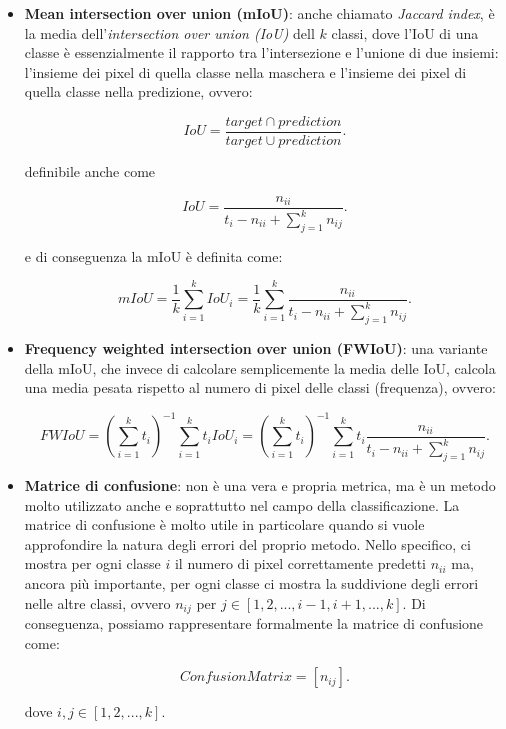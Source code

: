 \begin{itemize}
    
    \item \textbf{Mean intersection over union (mIoU)}: anche chiamato \textit{Jaccard index}, è la media dell'\textit{intersection over union (IoU)} dell $k$ classi, dove l'IoU di una classe è essenzialmente il rapporto tra l'intersezione e l'unione di due insiemi: l'insieme dei pixel di quella classe nella maschera e l'insieme dei pixel di quella classe nella predizione, ovvero:
    
    \begin{equation}
        IoU = \frac{target \cap prediction}{target \cup prediction}.
    \end{equation}
    
    definibile anche come
    
    \begin{equation}
        IoU = \frac{n_{ii}}{t_{i}-n_{ii}+\sum_{j=1}^k{n_{ij}}}.
    \end{equation}
    
     e di conseguenza la mIoU è definita come:
     
     \begin{equation}
         mIoU = \frac{1}{k} \sum_{i=1}^k{IoU_{i}} =
         \frac{1}{k} \sum_{i=1}^k{\frac{n_{ii}}{t_{i}-n_{ii}+\sum_{j=1}^k{n_{ij}}}}.
     \end{equation}
     
     
    \item \textbf{Frequency weighted intersection over union (FWIoU)}: una variante della mIoU, che invece di calcolare semplicemente la media delle IoU, calcola una media pesata rispetto al numero di pixel delle classi (frequenza), ovvero:
    
    \begin{equation}
        FWIoU = (\sum_{i=1}^k{t_{i}})^{-1} \sum_{i=1}^k{t_{i}IoU_{i}} = (\sum_{i=1}^k{t_{i}})^{-1} \sum_{i=1}^k{t_{i}\frac{n_{ii}}{t_{i}-n_{ii}+\sum_{j=1}^k{n_{ij}}}}.
    \end{equation}
    
    
    \item\textbf{Matrice di confusione}: non è una vera e propria metrica, ma è un metodo molto utilizzato anche e soprattutto nel campo della classificazione. La matrice di confusione è molto utile in particolare quando si vuole approfondire la natura degli errori del proprio metodo. Nello specifico, ci mostra per ogni classe $i$ il numero di pixel correttamente predetti $n_{ii}$ ma, ancora più importante, per ogni classe ci mostra la suddivione degli errori nelle altre classi, ovvero $n_{ij}$ per $j \in [1,2,..., i-1, i+1, ..., k]$. Di conseguenza, possiamo rappresentare formalmente la matrice di confusione come:
    
    \begin{equation}
        ConfusionMatrix = [n_{ij}].
    \end{equation}
    
    dove  $i,j \in [1, 2, ..., k]$.
    
\end{itemize}

